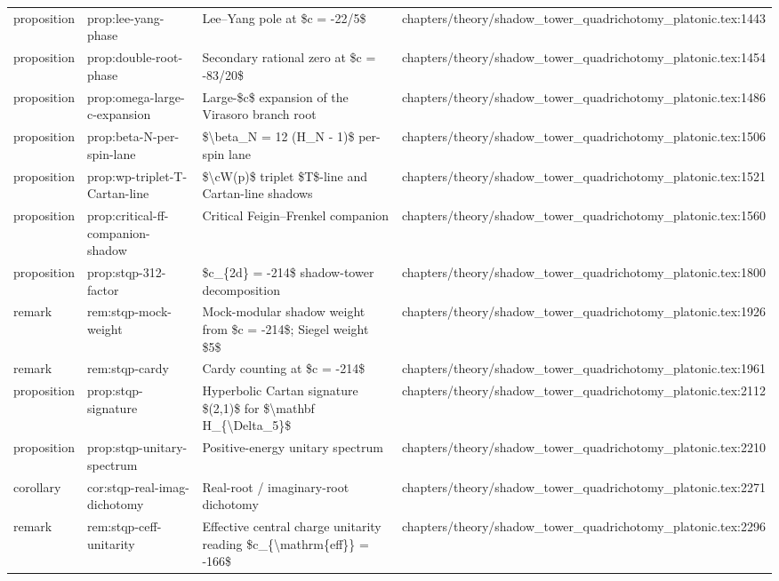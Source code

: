 \documentclass[11pt]{article}
\begin{document}
\begin{longtable}{L{0.10\textwidth}L{0.26\textwidth}L{0.42\textwidth}L{0.22\textwidth}}
proposition & prop:lee-yang-phase & Lee--Yang pole at \$c = -22/5\$ & chapters/theory/shadow\_tower\_quadrichotomy\_platonic.tex:1443\\
proposition & prop:double-root-phase & Secondary rational zero at \$c = -83/20\$ & chapters/theory/shadow\_tower\_quadrichotomy\_platonic.tex:1454\\
proposition & prop:omega-large-c-expansion & Large-\$c\$ expansion of the Virasoro branch root & chapters/theory/shadow\_tower\_quadrichotomy\_platonic.tex:1486\\
proposition & prop:beta-N-per-spin-lane & \$\textbackslash{}beta\_N = 12 (H\_N - 1)\$ per-spin lane & chapters/theory/shadow\_tower\_quadrichotomy\_platonic.tex:1506\\
proposition & prop:wp-triplet-T-Cartan-line & \$\textbackslash{}cW(p)\$ triplet \$T\$-line and Cartan-line shadows & chapters/theory/shadow\_tower\_quadrichotomy\_platonic.tex:1521\\
proposition & prop:critical-ff-companion-shadow & Critical Feigin--Frenkel companion & chapters/theory/shadow\_tower\_quadrichotomy\_platonic.tex:1560\\
proposition & prop:stqp-312-factor & \$c\_\{2d\} = -214\$ shadow-tower decomposition & chapters/theory/shadow\_tower\_quadrichotomy\_platonic.tex:1800\\
remark & rem:stqp-mock-weight & Mock-modular shadow weight from \$c = -214\$; Siegel weight \$5\$ & chapters/theory/shadow\_tower\_quadrichotomy\_platonic.tex:1926\\
remark & rem:stqp-cardy & Cardy counting at \$c = -214\$ & chapters/theory/shadow\_tower\_quadrichotomy\_platonic.tex:1961\\
proposition & prop:stqp-signature & Hyperbolic Cartan signature \$(2,1)\$ for \$\textbackslash{}mathbf H\_\{\textbackslash{}Delta\_5\}\$ & chapters/theory/shadow\_tower\_quadrichotomy\_platonic.tex:2112\\
proposition & prop:stqp-unitary-spectrum & Positive-energy unitary spectrum & chapters/theory/shadow\_tower\_quadrichotomy\_platonic.tex:2210\\
corollary & cor:stqp-real-imag-dichotomy & Real-root / imaginary-root dichotomy & chapters/theory/shadow\_tower\_quadrichotomy\_platonic.tex:2271\\
remark & rem:stqp-ceff-unitarity & Effective central charge unitarity reading \$c\_\{\textbackslash{}mathrm\{eff\}\} = -166\$ & chapters/theory/shadow\_tower\_quadrichotomy\_platonic.tex:2296\\

\end{longtable}
\end{document}
